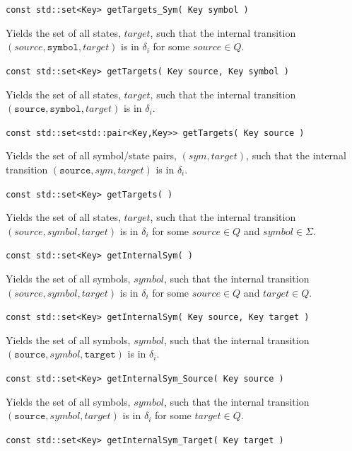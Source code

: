 \documentclass{llncs}
\begin{document}
\begin{description}
  \item\texttt{const std::set<Key> getTargets\_Sym( Key symbol )} \nopagebreak

    Yields the set of all states, $target$, such that the internal transition
    $(source,\texttt{symbol},target)$ is in $\delta_i$ for some $source \in
    Q$.

  \item\texttt{const std::set<Key> getTargets( Key source, Key symbol )} \nopagebreak

    Yields the set of all states, $target$, such that the internal transition
    $(\texttt{source},\texttt{symbol},target)$ is in $\delta_i$.

  \item\texttt{const std::set<std::pair<Key,Key>> getTargets( Key source )} \nopagebreak

    Yields the set of all symbol/state pairs, $(sym,target)$, such that the
    internal transition $(\texttt{source},sym,target)$ is in $\delta_i$.

  \item\texttt{const std::set<Key> getTargets( )} \nopagebreak

    Yields the set of all states, $target$, such that the internal transition
    $(source,symbol,target)$ is in $\delta_i$ for some $source \in Q$ and
    $symbol \in \Sigma$.

  \item\texttt{const std::set<Key> getInternalSym( )} \nopagebreak

    Yields the set of all symbols, $symbol$, such that the internal
    transition $(source,symbol,target)$ is in $\delta_i$ for some $source \in
    Q$ and $target \in Q$.

  \item\texttt{const std::set<Key> getInternalSym( Key source, Key target )} \nopagebreak

    Yields the set of all symbols, $symbol$, such that the internal
    transition $(\texttt{source},symbol,\texttt{target})$ is in $\delta_i$.

  \item\texttt{const std::set<Key> getInternalSym\_Source( Key source )} \nopagebreak

    Yields the set of all symbols, $symbol$, such that the internal
    transition $(\texttt{source},symbol,target)$ is in $\delta_i$ for some
    $target \in Q$.

  \item\texttt{const std::set<Key> getInternalSym\_Target( Key target )} \nopagebreak


\end{description}
\end{document}

